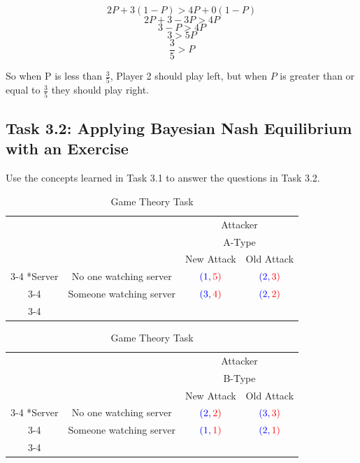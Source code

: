 \documentclass[letterpaper,12pt]{report}
\begin{document}
$$ 2P + 3(1-P) > 4P + 0(1-P) $$
$$ 2P + 3 - 3P  > 4P $$
$$ 3 - P > 4P $$
$$ 3 > 5P $$
$$ \frac{3}{5} > P $$

So when P is less than $\frac{3}{5}$, Player 2 should play left, but when $P$ is greater than or equal to $\frac{3}{5}$ they should play right.

\subsection*{Task 3.2: Applying Bayesian Nash Equilibrium with an Exercise}\label{sec:Task-3.2-Applying-Bayesian-Nash-Equilibrium-With-an-Exercise}

Use the concepts learned in Task 3.1 to answer the questions in Task 3.2.

\begin{table}[ht]
    \setlength{\extrarowheight}{2pt}
    \begin{tabular}{cc|c|c|}
      & \multicolumn{1}{c}{} & \multicolumn{2}{c}{\color{red}Attacker}\\
      & \multicolumn{1}{c}{} & \multicolumn{2}{c}{\color{red}A-Type}\\
      & \multicolumn{1}{c}{} & \multicolumn{1}{c}{\color{red}New Attack}  & \multicolumn{1}{c}{\color{red}Old Attack} \\\cline{3-4}
      \multirow{2}*{\color{blue}Server}  & \color{blue}No one watching server & $\color{blue}(1,\color{red}5)$ & $\color{blue}(2,\color{red}3)$ \\\cline{3-4}
      & \color{blue}Someone watching server & $\color{blue}(3,\color{red}4)$ & $\color{blue}(2,\color{red}2)$ \\\cline{3-4}
    \end{tabular}
    \begin{tabular}{cc|c|c|}
      & \multicolumn{1}{c}{} & \multicolumn{2}{c}{\color{red}Attacker}\\
      & \multicolumn{1}{c}{} & \multicolumn{2}{c}{\color{red}B-Type}\\
      & \multicolumn{1}{c}{} & \multicolumn{1}{c}{\color{red}New Attack}  & \multicolumn{1}{c}{\color{red}Old Attack} \\\cline{3-4}
      \multirow{2}*{\color{blue}Server}  & \color{blue}No one watching server & $\color{blue}(2,\color{red}2)$ & $\color{blue}(3,\color{red}3)$ \\\cline{3-4}
      &\color{blue}Someone watching server & $\color{blue}(1,\color{red}1)$ & $\color{blue}(2,\color{red}1)$ \\\cline{3-4}
    \end{tabular}
\caption{Game Theory Task}
\label{Tab:game_theory_3}
\end{table}
\end{document}
